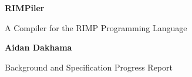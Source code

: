 \begin{titlepage}
    \begin{center}
        \vspace*{1cm}

        \textbf{RIMPiler}

        \vspace{0.5cm}
        A Compiler for the RIMP Programming Language

        \vspace{1.5cm}

        \textbf{Aidan Dakhama}

        \vfill

        Background and Specification Progress Report

    \end{center}
\end{titlepage}